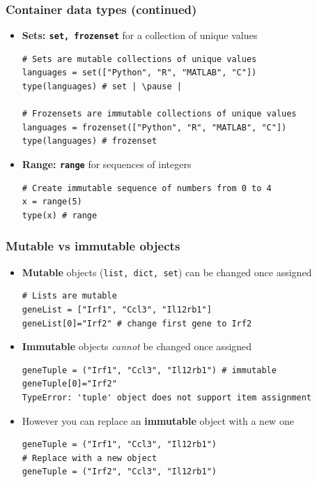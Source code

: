 \documentclass[xcolor=table]{beamer}
\begin{document}
\begin{frame}[fragile]
    \frametitle{Container data types (continued)}

\begin{itemize}\addtolength{\itemsep}{0.5\baselineskip}

\item<1-> \textbf{Sets: \texttt{set, frozenset}} for a collection of unique values
\begin{lstlisting}[style=python]
# Sets are mutable collections of unique values
languages = set(["Python", "R", "MATLAB", "C"])
type(languages) # set | \pause |

# Frozensets are immutable collections of unique values
languages = frozenset(["Python", "R", "MATLAB", "C"])
type(languages) # frozenset
\end{lstlisting}

\item<3-> \textbf{Range: \texttt{range}} for sequences of integers
\begin{lstlisting}[style=python]
# Create immutable sequence of numbers from 0 to 4
x = range(5)
type(x) # range
\end{lstlisting}

\end{itemize}

\end{frame}

\begin{frame}[fragile]
\frametitle{Mutable vs immutable objects}

\begin{itemize}
\item<1-> \textbf{Mutable} objects (\texttt{list, dict, set}) can be changed once assigned
\begin{lstlisting}[style=python]
# Lists are mutable
geneList = ["Irf1", "Ccl3", "Il12rb1"]
geneList[0]="Irf2" # change first gene to Irf2
\end{lstlisting}  

\item<2-> \textbf{Immutable} objects \textit{cannot} be changed once assigned 
\begin{lstlisting}[style=python]
geneTuple = ("Irf1", "Ccl3", "Il12rb1") # immutable
geneTuple[0]="Irf2"
TypeError: 'tuple' object does not support item assignment
\end{lstlisting}

\item<3-> However you can replace an \textbf{immutable} object with a new one 
\begin{lstlisting}[style=python]
geneTuple = ("Irf1", "Ccl3", "Il12rb1")
# Replace with a new object
geneTuple = ("Irf2", "Ccl3", "Il12rb1")
\end{lstlisting} 

\end{itemize}

\end{frame}
\end{document}
